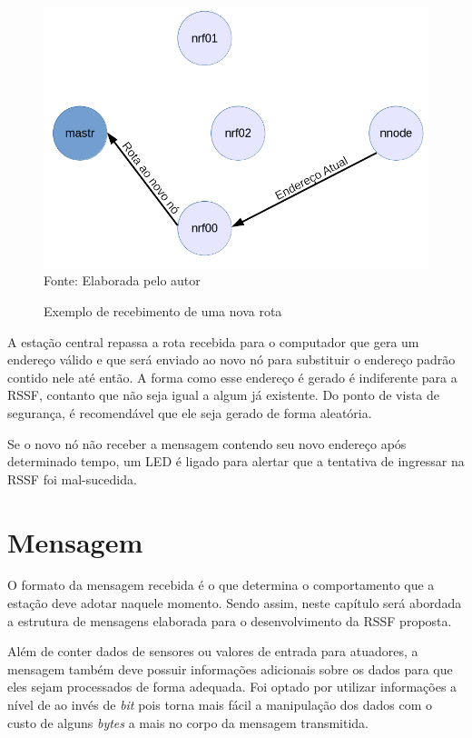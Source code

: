 {\begin{figure}[h!]
	\caption{Exemplo de recebimento de uma nova rota}
	\centering
	\includegraphics[scale=0.5]{../images/nova_rota.png}
	\hspace{\linewidth}
	Fonte: Elaborada pelo autor
	\label{figura:new_route}
\end{figure}

A estação central repassa a rota recebida para o computador que gera um endereço válido e que será enviado ao
novo nó para substituir o endereço padrão contido nele até então. A forma como esse endereço é gerado é
indiferente para a RSSF, contanto que não seja igual a algum já existente. Do ponto de vista de segurança, é
recomendável que ele seja gerado de forma aleatória.

Se o novo nó não receber a mensagem contendo seu novo endereço após determinado tempo, um LED é ligado para
alertar que a tentativa de ingressar na RSSF foi mal-sucedida.

\section{Mensagem}
O formato da mensagem recebida é o que determina o comportamento que a estação deve adotar naquele momento.
Sendo assim, neste capítulo será abordada a estrutura de mensagens elaborada para o desenvolvimento da RSSF
proposta.

Além de conter dados de sensores ou valores de entrada para atuadores, a mensagem também deve possuir
informações adicionais sobre os dados para que eles sejam processados de forma adequada. Foi optado por
utilizar informações a nível de  ao invés de \textit{bit} pois torna mais fácil a manipulação dos
dados com o custo de alguns \textit{bytes} a mais no corpo da mensagem transmitida.

}
